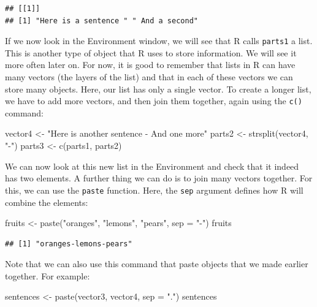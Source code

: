 \documentclass[
]{book}
\newenvironment{Shaded}{\begin{snugshade}}{\end{snugshade}}
\newcommand{\AttributeTok}[1]{\textcolor[rgb]{0.77,0.63,0.00}{#1}}
\newcommand{\FunctionTok}[1]{\textcolor[rgb]{0.00,0.00,0.00}{#1}}
\newcommand{\NormalTok}[1]{#1}
\newcommand{\OtherTok}[1]{\textcolor[rgb]{0.56,0.35,0.01}{#1}}
\newcommand{\StringTok}[1]{\textcolor[rgb]{0.31,0.60,0.02}{#1}}
\begin{document}
\begin{verbatim}
## [[1]]
## [1] "Here is a sentence " " And a second"
\end{verbatim}

If we now look in the Environment window, we will see that R calls \texttt{parts1} a list. This is another type of object that R uses to store information. We will see it more often later on. For now, it is good to remember that lists in R can have many vectors (the layers of the list) and that in each of these vectors we can store many objects. Here, our list has only a single vector. To create a longer list, we have to add more vectors, and then join them together, again using the \texttt{c()} command:

\begin{Shaded}
\begin{Highlighting}[]
\NormalTok{vector4 }\OtherTok{\textless{}{-}} \StringTok{"Here is another sentence {-} And one more"}
\NormalTok{parts2 }\OtherTok{\textless{}{-}} \FunctionTok{strsplit}\NormalTok{(vector4, }\StringTok{"{-}"}\NormalTok{)}
\NormalTok{parts3 }\OtherTok{\textless{}{-}} \FunctionTok{c}\NormalTok{(parts1, parts2)}
\end{Highlighting}
\end{Shaded}

We can now look at this new list in the Environment and check that it indeed has two elements. A further thing we can do is to join many vectors together. For this, we can use the \texttt{paste} function. Here, the \texttt{sep} argument defines how R will combine the elements:

\begin{Shaded}
\begin{Highlighting}[]
\NormalTok{fruits }\OtherTok{\textless{}{-}} \FunctionTok{paste}\NormalTok{(}\StringTok{"oranges"}\NormalTok{, }\StringTok{"lemons"}\NormalTok{, }\StringTok{"pears"}\NormalTok{, }\AttributeTok{sep =} \StringTok{"{-}"}\NormalTok{)}
\NormalTok{fruits}
\end{Highlighting}
\end{Shaded}

\begin{verbatim}
## [1] "oranges-lemons-pears"
\end{verbatim}

Note that we can also use this command that paste objects that we made earlier together. For example:

\begin{Shaded}
\begin{Highlighting}[]
\NormalTok{sentences }\OtherTok{\textless{}{-}} \FunctionTok{paste}\NormalTok{(vector3, vector4, }\AttributeTok{sep =} \StringTok{"."}\NormalTok{)}
\NormalTok{sentences}
\end{Highlighting}
\end{Shaded}
\end{document}
